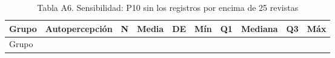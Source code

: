 \documentclass[
  spanish,
  12pt,
]{extarticle}
\begin{document}
\begin{longtable}[]{@{}
  >{\raggedright\arraybackslash}p{}
  >{\raggedright\arraybackslash}p{}
  >{\raggedleft\arraybackslash}p{}
  >{\raggedleft\arraybackslash}p{}
  >{\raggedleft\arraybackslash}p{}
  >{\raggedleft\arraybackslash}p{}
  >{\raggedleft\arraybackslash}p{}
  >{\raggedleft\arraybackslash}p{}
  >{\raggedleft\arraybackslash}p{}
  >{\raggedleft\arraybackslash}p{}@{}}
\caption{Tabla A6. Sensibilidad: P10 sin los registros por encima de 25
revistas}\tabularnewline
\toprule\noalign{}
\begin{minipage}[b]{\linewidth}\raggedright
Grupo
\end{minipage} & \begin{minipage}[b]{\linewidth}\raggedright
Autopercepción
\end{minipage} & \begin{minipage}[b]{\linewidth}\raggedleft
N
\end{minipage} & \begin{minipage}[b]{\linewidth}\raggedleft
Media
\end{minipage} & \begin{minipage}[b]{\linewidth}\raggedleft
DE
\end{minipage} & \begin{minipage}[b]{\linewidth}\raggedleft
Mín
\end{minipage} & \begin{minipage}[b]{\linewidth}\raggedleft
Q1
\end{minipage} & \begin{minipage}[b]{\linewidth}\raggedleft
Mediana
\end{minipage} & \begin{minipage}[b]{\linewidth}\raggedleft
Q3
\end{minipage} & \begin{minipage}[b]{\linewidth}\raggedleft
Máx
\end{minipage} \\
\midrule\noalign{}
\endfirsthead
\toprule\noalign{}
\begin{minipage}[b]{\linewidth}\raggedright
Grupo

\end{minipage}
\end{longtable}
\end{document}
